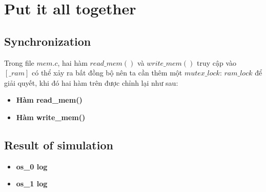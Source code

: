 \section{Put it all together}
\subsection{Synchronization}
Trong file  $ mem.c $, hai hàm $ read\_mem() $ và $ write\_mem() $ truy cập vào $ [\_ram] $ có thể xảy ra bất đồng bộ nên ta cần thêm một $ mutex\_lock $: $ ram\_lock $ để giải quyết, khi đó hai hàm trên được chỉnh lại như sau:
\begin{itemize}
	\item \textbf{Hàm read\_mem()}
		
	\item \textbf{Hàm write\_mem()}
		
\end{itemize}
\subsection{Result of simulation}
\begin{itemize}
	\item \textbf{os\_0 log}
		
	\item \textbf{os\_1 log}
		
\end{itemize}
